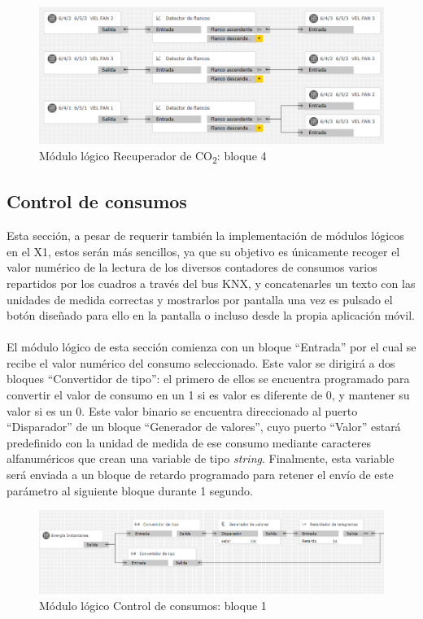 \begin{figure}[H]
\centering
\includegraphics[width=1.05\textwidth]{figures/log_co2_b4.png}   
\caption{Módulo lógico Recuperador de CO\textsubscript{2}: bloque 4}
\label{fig:log_co2_b4}
\end{figure}


\subsection{Control de consumos}Esta sección, a pesar de requerir también la implementación de módulos lógicos en el X1, estos serán más sencillos, ya que su objetivo es únicamente recoger el valor numérico de la lectura de los diversos contadores de consumos varios repartidos por los cuadros a través del bus KNX, y concatenarles un texto con las unidades de medida correctas y mostrarlos por pantalla una vez es pulsado el botón diseñado para ello en la pantalla o incluso desde la propia aplicación móvil. \\\\
El módulo lógico de esta sección comienza con un bloque “Entrada” por el cual se recibe el valor numérico del consumo seleccionado. Este valor se dirigirá a dos bloques “Convertidor de tipo”: el primero de ellos se encuentra programado para convertir el valor de consumo en un 1 si es valor es diferente de 0, y mantener su valor si es un 0. Este valor binario se encuentra direccionado al puerto “Disparador” de un bloque “Generador de valores”, cuyo puerto “Valor” estará predefinido con la unidad de medida de ese consumo mediante caracteres alfanuméricos que crean una variable de tipo \textit{string}. Finalmente, esta variable será enviada a un bloque de retardo programado para retener el envío de este parámetro al siguiente bloque durante 1 segundo.
\begin{figure}[H]
\centering
\includegraphics[width=1.15\textwidth]{figures/log_consu_b1.png}   
\caption{Módulo lógico Control de consumos: bloque 1}
\label{fig:log_consu_b1}
\end{figure}
